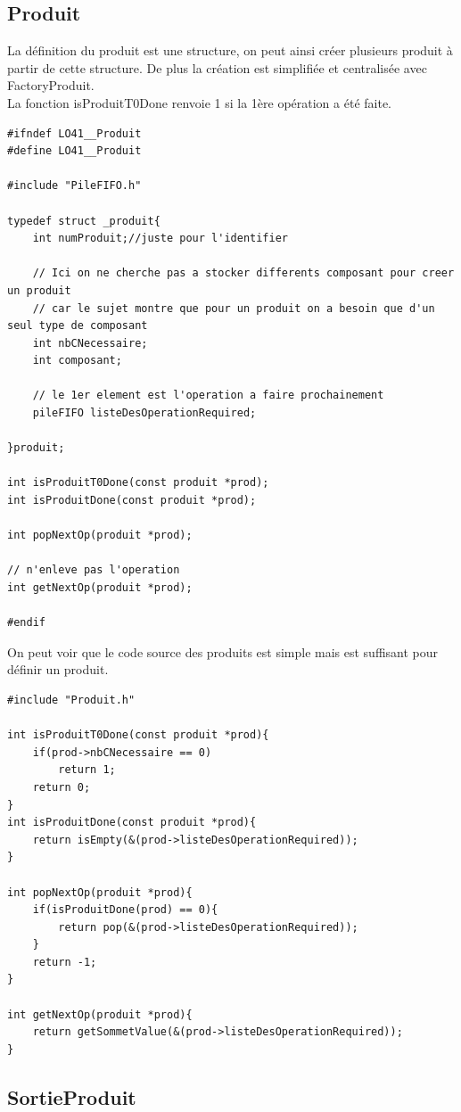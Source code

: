 \documentclass{report}
\begin{document}
\subsection{Produit}
La définition du produit est une structure, on peut ainsi créer plusieurs produit à partir de cette structure. De plus la création est simplifiée et centralisée avec FactoryProduit.\\
La fonction isProduitT0Done renvoie 1 si la 1ère opération a été faite.
\begin{lstlisting}[caption=Représentation des produits]
#ifndef LO41__Produit
#define LO41__Produit

#include "PileFIFO.h"

typedef struct _produit{
    int numProduit;//juste pour l'identifier
    
    // Ici on ne cherche pas a stocker differents composant pour creer un produit
    // car le sujet montre que pour un produit on a besoin que d'un seul type de composant
    int nbCNecessaire;
    int composant;
    
    // le 1er element est l'operation a faire prochainement
    pileFIFO listeDesOperationRequired;
    
}produit;

int isProduitT0Done(const produit *prod);
int isProduitDone(const produit *prod);

int popNextOp(produit *prod);

// n'enleve pas l'operation
int getNextOp(produit *prod);

#endif
\end{lstlisting}

On peut voir que le code source des produits est simple mais est suffisant pour définir un produit.
\begin{lstlisting}[caption=Code source des produits]
#include "Produit.h"

int isProduitT0Done(const produit *prod){
    if(prod->nbCNecessaire == 0)
        return 1;
    return 0;
}
int isProduitDone(const produit *prod){
    return isEmpty(&(prod->listeDesOperationRequired));
}

int popNextOp(produit *prod){
    if(isProduitDone(prod) == 0){
        return pop(&(prod->listeDesOperationRequired));
    }
    return -1;
}

int getNextOp(produit *prod){
    return getSommetValue(&(prod->listeDesOperationRequired));
}
\end{lstlisting}
\subsection{SortieProduit}
\end{document}
